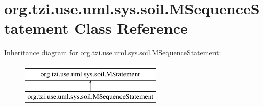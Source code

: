 \hypertarget{classorg_1_1tzi_1_1use_1_1uml_1_1sys_1_1soil_1_1_m_sequence_statement}{\section{org.\-tzi.\-use.\-uml.\-sys.\-soil.\-M\-Sequence\-Statement Class Reference}
\label{classorg_1_1tzi_1_1use_1_1uml_1_1sys_1_1soil_1_1_m_sequence_statement}
}
Inheritance diagram for org.\-tzi.\-use.\-uml.\-sys.\-soil.\-M\-Sequence\-Statement\-:\begin{figure}[H]
\begin{center}
\leavevmode
\includegraphics[height=2.000000cm]{classorg_1_1tzi_1_1use_1_1uml_1_1sys_1_1soil_1_1_m_sequence_statement}
\end{center}
\end{figure}
